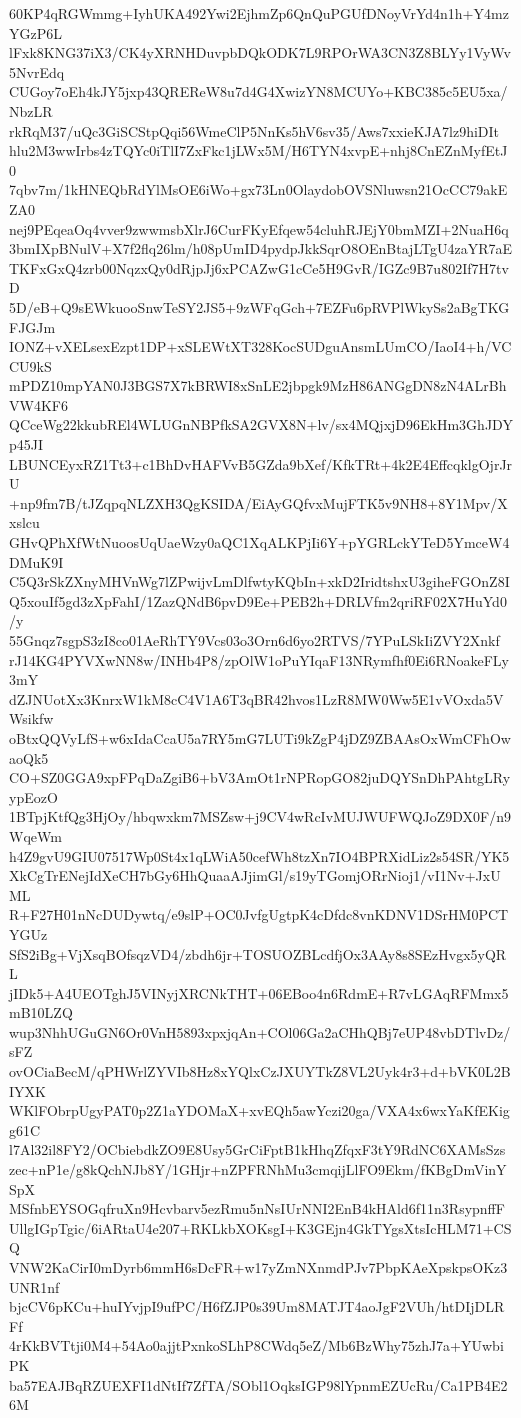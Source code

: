 60KP4qRGWmmg+IyhUKA492Ywi2EjhmZp6QnQuPGUfDNoyVrYd4n1h+Y4mzYGzP6L
lFxk8KNG37iX3/CK4yXRNHDuvpbDQkODK7L9RPOrWA3CN3Z8BLYy1VyWv5NvrEdq
CUGoy7oEh4kJY5jxp43QREReW8u7d4G4XwizYN8MCUYo+KBC385c5EU5xa/NbzLR
rkRqM37/uQc3GiSCStpQqi56WmeClP5NnKs5hV6sv35/Aws7xxieKJA7lz9hiDIt
hlu2M3wwIrbs4zTQYc0iTlI7ZxFkc1jLWx5M/H6TYN4xvpE+nhj8CnEZnMyfEtJ0
7qbv7m/1kHNEQbRdYlMsOE6iWo+gx73Ln0OlaydobOVSNluwsn21OcCC79akEZA0
nej9PEqeaOq4vver9zwwmsbXlrJ6CurFKyEfqew54cluhRJEjY0bmMZI+2NuaH6q
3bmIXpBNulV+X7f2flq26lm/h08pUmID4pydpJkkSqrO8OEnBtajLTgU4zaYR7aE
TKFxGxQ4zrb00NqzxQy0dRjpJj6xPCAZwG1cCe5H9GvR/IGZc9B7u802If7H7tvD
5D/eB+Q9sEWkuooSnwTeSY2JS5+9zWFqGch+7EZFu6pRVPlWkySs2aBgTKGFJGJm
IONZ+vXELsexEzpt1DP+xSLEWtXT328KocSUDguAnsmLUmCO/IaoI4+h/VCCU9kS
mPDZ10mpYAN0J3BGS7X7kBRWI8xSnLE2jbpgk9MzH86ANGgDN8zN4ALrBhVW4KF6
QCceWg22kkubREl4WLUGnNBPfkSA2GVX8N+lv/sx4MQjxjD96EkHm3GhJDYp45JI
LBUNCEyxRZ1Tt3+c1BhDvHAFVvB5GZda9bXef/KfkTRt+4k2E4EffcqklgOjrJrU
+np9fm7B/tJZqpqNLZXH3QgKSIDA/EiAyGQfvxMujFTK5v9NH8+8Y1Mpv/Xxslcu
GHvQPhXfWtNuoosUqUaeWzy0aQC1XqALKPjIi6Y+pYGRLckYTeD5YmceW4DMuK9I
C5Q3rSkZXnyMHVnWg7lZPwijvLmDlfwtyKQbIn+xkD2IridtshxU3giheFGOnZ8I
Q5xouIf5gd3zXpFahI/1ZazQNdB6pvD9Ee+PEB2h+DRLVfm2qriRF02X7HuYd0/y
55Gnqz7sgpS3zI8co01AeRhTY9Vcs03o3Orn6d6yo2RTVS/7YPuLSkIiZVY2Xnkf
rJ14KG4PYVXwNN8w/INHb4P8/zpOlW1oPuYIqaF13NRymfhf0Ei6RNoakeFLy3mY
dZJNUotXx3KnrxW1kM8cC4V1A6T3qBR42hvos1LzR8MW0Ww5E1vVOxda5VWsikfw
oBtxQQVyLfS+w6xIdaCcaU5a7RY5mG7LUTi9kZgP4jDZ9ZBAAsOxWmCFhOwaoQk5
CO+SZ0GGA9xpFPqDaZgiB6+bV3AmOt1rNPRopGO82juDQYSnDhPAhtgLRyypEozO
1BTpjKtfQg3HjOy/hbqwxkm7MSZsw+j9CV4wRcIvMUJWUFWQJoZ9DX0F/n9WqeWm
h4Z9gvU9GIU07517Wp0St4x1qLWiA50cefWh8tzXn7IO4BPRXidLiz2s54SR/YK5
XkCgTrENejIdXeCH7bGy6HhQuaaAJjimGl/s19yTGomjORrNioj1/vI1Nv+JxUML
R+F27H01nNcDUDywtq/e9slP+OC0JvfgUgtpK4cDfdc8vnKDNV1DSrHM0PCTYGUz
SfS2iBg+VjXsqBOfsqzVD4/zbdh6jr+TOSUOZBLcdfjOx3AAy8s8SEzHvgx5yQRL
jIDk5+A4UEOTghJ5VINyjXRCNkTHT+06EBoo4n6RdmE+R7vLGAqRFMmx5mB10LZQ
wup3NhhUGuGN6Or0VnH5893xpxjqAn+COl06Ga2aCHhQBj7eUP48vbDTlvDz/sFZ
ovOCiaBecM/qPHWrlZYVIb8Hz8xYQlxCzJXUYTkZ8VL2Uyk4r3+d+bVK0L2BIYXK
WKlFObrpUgyPAT0p2Z1aYDOMaX+xvEQh5awYczi20ga/VXA4x6wxYaKfEKigg61C
l7Al32il8FY2/OCbiebdkZO9E8Usy5GrCiFptB1kHhqZfqxF3tY9RdNC6XAMsSzs
zec+nP1e/g8kQchNJb8Y/1GHjr+nZPFRNhMu3cmqijLlFO9Ekm/fKBgDmVinYSpX
MSfnbEYSOGqfruXn9Hcvbarv5ezRmu5nNsIUrNNI2EnB4kHAld6f11n3RsypnffF
UllgIGpTgic/6iARtaU4e207+RKLkbXOKsgI+K3GEjn4GkTYgsXtsIcHLM71+CSQ
VNW2KaCirI0mDyrb6mmH6sDcFR+w17yZmNXnmdPJv7PbpKAeXpskpsOKz3UNR1nf
bjcCV6pKCu+huIYvjpI9ufPC/H6fZJP0s39Um8MATJT4aoJgF2VUh/htDIjDLRFf
4rKkBVTtji0M4+54Ao0ajjtPxnkoSLhP8CWdq5eZ/Mb6BzWhy75zhJ7a+YUwbiPK
ba57EAJBqRZUEXFI1dNtIf7ZfTA/SObl1OqksIGP98lYpnmEZUcRu/Ca1PB4E26M
